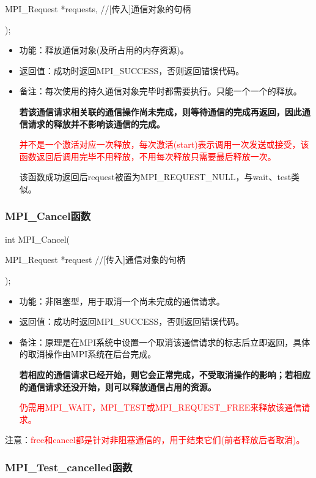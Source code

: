 \documentclass[UTF8]{article}%
\begin{document}
    \qquad MPI\_Request *requests, //[传入]通信对象的句柄

);

\begin{itemize}
    \item 功能：释放通信对象(及所占用的内存资源)。
    \item 返回值：成功时返回MPI\_SUCCESS，否则返回错误代码。
    \item 备注：每次使用的持久通信对象完毕时都需要执行。只能一个一个的释放。
    
    \textbf{若该通信请求相关联的通信操作尚未完成，则等待通信的完成再返回，因此通信请求的释放并不影响该通信的完成。}

    \textcolor{red}{并不是一个激活对应一次释放，每次激活(start)表示调用一次发送或接受，该函数返回后调用完毕不用释放，不用每次释放只需要最后释放一次。}

    该函数成功返回后request被置为MPI\_REQUEST\_NULL，与wait、test类似。

\end{itemize}

\subsubsection{MPI\_Cancel函数}

int MPI\_Cancel(

    \qquad MPI\_Request *request //[传入]通信对象的句柄

);

\begin{itemize}
    \item 功能：非阻塞型，用于取消一个尚未完成的通信请求。
    \item 返回值：成功时返回MPI\_SUCCESS，否则返回错误代码。
    \item 备注：原理是在MPI系统中设置一个取消该通信请求的标志后立即返回，具体的取消操作由MPI系统在后台完成。
    
    \textbf{若相应的通信请求已经开始，则它会正常完成，不受取消操作的影响；若相应的通信请求还没开始，则可以释放通信占用的资源。}

    \textcolor{red}{仍需用MPI\_WAIT，MPI\_TEST或MPI\_REQUEST\_FREE来释放该通信请求。}

\end{itemize}

注意：\textcolor{red}{free和cancel都是针对非阻塞通信的，用于结束它们(前者释放后者取消)。}

\subsubsection{MPI\_Test\_cancelled函数}
\end{document}
